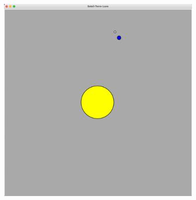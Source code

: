 \documentclass{article}
\begin{document}
\begin{center}
\includegraphics[width=10cm]{soleilTerreLune.png}
\end{center}

  
\end{document}
